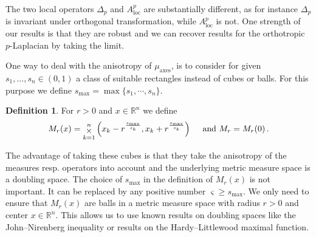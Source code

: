 \documentclass[11pt]{amsart}
\theoremstyle{plain}
\theoremstyle{definition}
\newtheorem{definition}[theorem]{Definition}
\numberwithin{equation}{section}
\newcommand{\R}{\mathbb{R}}
\newcommand{\ma}{\mu_{\mathrm{axes}}}
\newcommand{\BIGOP}[1]
{
\mathop{\mathchoice%
{\raise-0.22em\hbox{\huge $#1$}}%
{\raise-0.05em\hbox{\Large $#1$}}{\hbox{\large $#1$}}{#1}}}
\newcommand{\bigtimes}{\BIGOP{\times}}
\begin{document}
The two local operators $\Delta_p$ and $A_{\text{loc}}^p$ are substantially different, as for instance $\Delta_p$ is invariant under orthogonal transformation, while $A_{\text{loc}}^p$ is not. One strength of our results is that they are robust and we can recover results for the orthotropic $p$-Laplacian by taking the limit. 

One way to deal with the anisotropy of $\ma$, is to consider for given 
$s_1,\dots,s_n\in(0,1)$ a class of suitable rectangles instead of cubes or balls. For this purpose we define $s_{\max} = \max\lbrace s_1, \cdots, s_n \rbrace$.
\begin{definition}\label{def:M_r}
For $r>0$ and $x\in\R^n$ we define 
\begin{align*}
M_r(x) =\bigtimes_{k=1}^n 
\left(x_k-r^{\frac{s_{\max}}{s_k}},x_k+r^{\frac{s_{\max}}{s_k}}\right) 
\quad \text{ and } M_r = M_r(0) \,.
\end{align*}
\end{definition}
The advantage of taking these cubes is that they take the anisotropy of the measures resp. operators into account and the underlying metric measure space is a doubling space. The choice of $s_{\max}$ in the definition of $M_r(x)$ is not important. It can be replaced by any positive number $\varsigma \geq s_{\max}$. We only need to ensure that $M_r(x)$ are balls in a metric measure space with radius $r > 0$ and center $x \in \mathbb{R}^n$. This allows us to use known results on doubling spaces like the John--Nirenberg inequality or results on the Hardy--Littlewood maximal function. 
\end{document}
